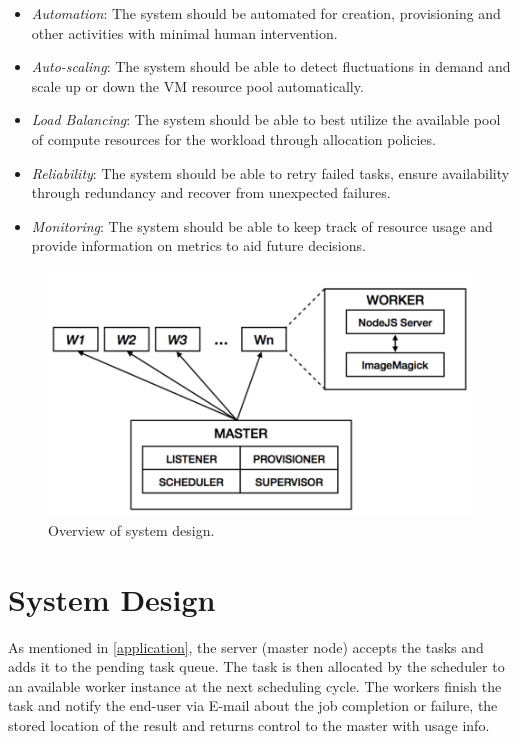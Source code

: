 \documentclass[a4paper]{IEEEtran}
\begin{document}
\begin{itemize}
  \item \emph{Automation}: The system should be automated for creation, provisioning and other activities
  with minimal human intervention.
  \item \emph{Auto-scaling}: The system should be able to detect fluctuations in demand and scale up or down the VM resource pool automatically.
  \item \emph{Load Balancing}: The system should be able to best utilize the available pool of compute resources
  for the workload through allocation policies.
  \item \emph{Reliability}: The system should be able to retry failed tasks, ensure availability through redundancy and recover from unexpected failures.
  \item \emph{Monitoring}: The system should be able to keep track of resource usage and provide information
  on metrics to aid future decisions.
\end{itemize}

\begin{figure}[tbp]
  \centering
    \includegraphics[width=\columnwidth]{system-design.png}
  \caption{Overview of system design.}
  \label{fig:overview_system_design}
\end{figure}

\section{System Design} \label{system_design}

As mentioned in \autoref{application}, the server (master node) accepts the tasks and adds it to the pending task queue. The task is then allocated by the scheduler to an available worker instance at the next scheduling cycle. The workers finish the task and notify the end-user via E-mail about the job completion or failure, the stored location of the result and returns control to the master with usage info.
\end{document}
